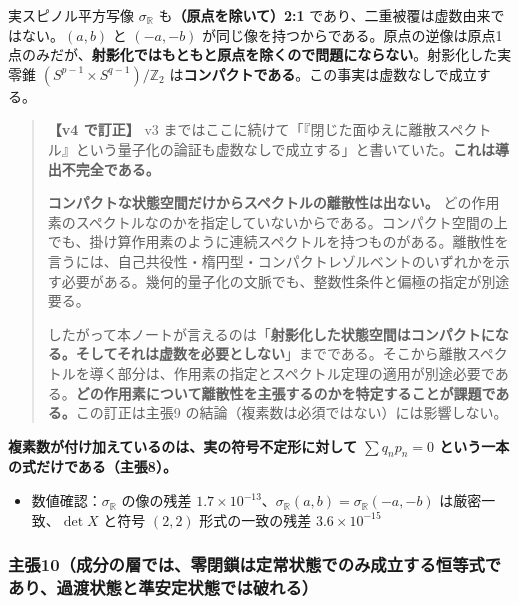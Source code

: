\documentclass[
  10pt,
]{ltjsarticle}
\providecommand{\tightlist}{%
  \setlength{\itemsep}{0pt}\setlength{\parskip}{0pt}}
\begin{document}
実スピノル平方写像 \(\sigma_{\mathbb{R}}\)
も\textbf{（原点を除いて）2:1}
であり、二重被覆は虚数由来ではない。\((a,b)\) と \((-a,-b)\)
が同じ像を持つからである。原点の逆像は原点1点のみだが、\textbf{射影化ではもともと原点を除くので問題にならない}。射影化した実零錐
\((S^{p-1}\times S^{q-1})/\mathbb{Z}_2\)
は\textbf{コンパクトである}。この事実は虚数なしで成立する。

\begin{quote}
\textbf{【v4 で訂正】} v3
まではここに続けて「『閉じた面ゆえに離散スペクトル』という量子化の論証も虚数なしで成立する」と書いていた。\textbf{これは導出不完全である。}

\textbf{コンパクトな状態空間だけからスペクトルの離散性は出ない。}
どの作用素のスペクトルなのかを指定していないからである。コンパクト空間の上でも、掛け算作用素のように連続スペクトルを持つものがある。離散性を言うには、自己共役性・楕円型・コンパクトレゾルベントのいずれかを示す必要がある。幾何的量子化の文脈でも、整数性条件と偏極の指定が別途要る。

したがって本ノートが言えるのは「\textbf{射影化した状態空間はコンパクトになる。そしてそれは虚数を必要としない}」までである。そこから離散スペクトルを導く部分は、作用素の指定とスペクトル定理の適用が別途必要である。\textbf{どの作用素について離散性を主張するのかを特定することが課題である。}この訂正は主張9
の結論（複素数は必須ではない）には影響しない。
\end{quote}

\textbf{複素数が付け加えているのは、実の符号不定形に対して
\(\sum q_n p_n = 0\) という一本の式だけである（主張8）。}

\begin{itemize}
\tightlist
\item
  数値確認：\(\sigma_{\mathbb{R}}\) の像の残差
  \(1.7\times10^{-13}\)、\(\sigma_{\mathbb{R}}(a,b) = \sigma_{\mathbb{R}}(-a,-b)\)
  は厳密一致、\(\det X\) と符号 \((2,2)\) 形式の一致の残差
  \(3.6\times10^{-15}\)
\end{itemize}

\subsubsection{主張10（成分の層では、零閉鎖は定常状態でのみ成立する恒等式であり、過渡状態と準安定状態では破れる）}\label{ux4e3bux5f3510ux6210ux5206ux306eux5c64ux3067ux306fux96f6ux9589ux9396ux306fux5b9aux5e38ux72b6ux614bux3067ux306eux307fux6210ux7acbux3059ux308bux6052ux7b49ux5f0fux3067ux3042ux308aux904eux6e21ux72b6ux614bux3068ux6e96ux5b89ux5b9aux72b6ux614bux3067ux306fux7834ux308cux308b}
\end{document}
